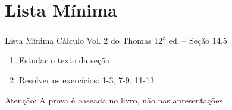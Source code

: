 

\section{Lista Mínima}

\begin{frame}{Lista Mínima}
  Cálculo Vol. 2 do Thomas 12\textsuperscript{a} ed. -- Seção 14.5
  \begin{enumerate}
    \item Estudar o texto da seção
    \item Resolver os exercícios: 1-3, 7-9, 11-13
  \end{enumerate}

  \vfill
  Atenção: A prova é baseada no livro, não nas apresentações
\end{frame}


